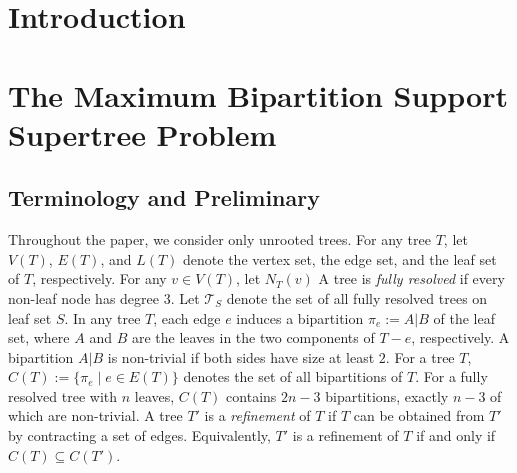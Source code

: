 \documentclass{bmcart}
\begin{document}


\section{Introduction}






\section{The Maximum Bipartition Support Supertree Problem} \label{sec:alg}
\subsection{Terminology and Preliminary}

Throughout the paper, we consider only unrooted trees. For any tree $T$, let $V(T)$, $E(T)$, and $L(T)$ denote the vertex set, the edge set, and the leaf set of $T$, respectively. For any $v\in V(T)$, let $N_T(v)$  A tree is \textit{fully resolved} if every non-leaf node has degree $3$. Let $\mathcal{T}_S$ denote the set of all fully resolved trees on leaf set $S$. In any tree $T$, each edge $e$ induces a bipartition $\pi_e := A|B$ of the leaf set, where $A$ and $B$ are the leaves in the two components of $T-e$, respectively. A bipartition $A|B$ is non-trivial if both sides have size at least $2$. For a tree $T$, $C(T) := \{\pi_e \mid e\in E(T)\}$ denotes the set of all bipartitions of $T$. For a fully resolved tree with $n$ leaves, $C(T)$ contains $2n-3$ bipartitions, exactly $n-3$ of which are non-trivial. A tree $T'$ is a \textit{refinement} of $T$ if $T$ can be obtained from $T'$ by contracting a set of edges. Equivalently, $T'$ is a refinement of $T$ if and only if $C(T) \subseteq C(T')$.\\
\end{document}
